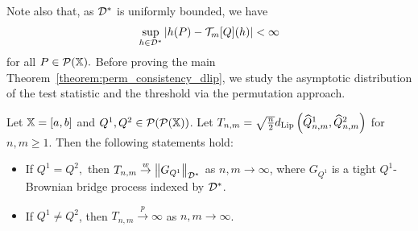 Note also that, as $\mathcal{D}^*$ is uniformly bounded, we have
\[
\sup_{h \in \mathcal{D}^*} \left|h(P) - \mathcal{T}_m[Q](h)\right| < \infty
\]
for all $P \in \mathcal{P}(\mathbb{X}).$
Before proving the main Theorem~\ref{theorem:perm_consistency_dlip}, we study the asymptotic distribution of the test statistic and the threshold via the permutation approach.
\begin{theorem}
\label{theorem::asympt_distr_dlip}
Let $\mathbb{X} = [a,b]$ and $Q^1, Q^2 \in \mathcal{P}(\mathcal{P}(\mathbb{X}))$. Let $T_{n,m} = \sqrt{\frac{n}{2}}d_{\mathrm{Lip}} \left(\widehat{Q}^1_{n,m}, \widehat{Q}^2_{n,m} \right)$ for $n,m \geq 1$. Then the following statements hold:
\begin{itemize}
    \item If $Q^1 = Q^2,$ then $T_{n,m} \overset{w}{\to} \left\| G_{Q^1} \right\|_{\mathcal{D}^*}$ as $n,m \to \infty$, where $G_{Q^1}$ is a tight $Q^1$-Brownian bridge process indexed by $\mathcal{D}^*$.
    \item If $Q^1 \neq Q^2$, then $T_{n,m} \overset{p}{\to} \infty$ as $n,m \to \infty$.
\end{itemize}
\end{theorem}
